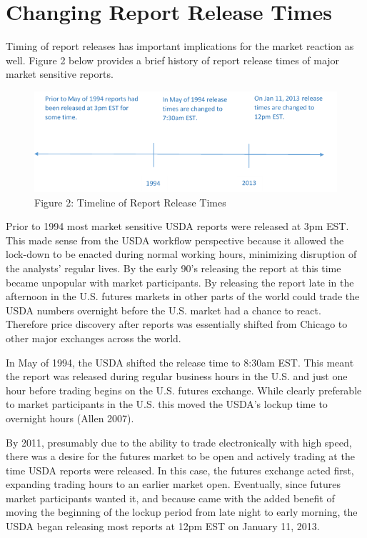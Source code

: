 \documentclass[
  letterpaper,
  DIV=11,
  numbers=noendperiod]{scrreprt}
\begin{document}
\hypertarget{changing-report-release-times}{%
\section{Changing Report Release
Times}\label{changing-report-release-times}}

Timing of report releases has important implications for the market
reaction as well. Figure 2 below provides a brief history of report
release times of major market sensitive reports.

\begin{figure}

{\centering \includegraphics{images/NASS_release_timeline.png}

}

\caption{Figure 2: Timeline of Report Release Times}

\end{figure}

Prior to 1994 most market sensitive USDA reports were released at 3pm
EST. This made sense from the USDA workflow perspective because it
allowed the lock-down to be enacted during normal working hours,
minimizing disruption of the analysts' regular lives. By the early 90's
releasing the report at this time became unpopular with market
participants. By releasing the report late in the afternoon in the U.S.
futures markets in other parts of the world could trade the USDA numbers
overnight before the U.S. market had a chance to react. Therefore price
discovery after reports was essentially shifted from Chicago to other
major exchanges across the world.

In May of 1994, the USDA shifted the release time to 8:30am EST. This
meant the report was released during regular business hours in the U.S.
and just one hour before trading begins on the U.S. futures exchange.
While clearly preferable to market participants in the U.S. this moved
the USDA's lockup time to overnight hours (Allen 2007).

By 2011, presumably due to the ability to trade electronically with high
speed, there was a desire for the futures market to be open and actively
trading at the time USDA reports were released. In this case, the
futures exchange acted first, expanding trading hours to an earlier
market open. Eventually, since futures market participants wanted it,
and because came with the added benefit of moving the beginning of the
lockup period from late night to early morning, the USDA began releasing
most reports at 12pm EST on January 11, 2013.
\end{document}
